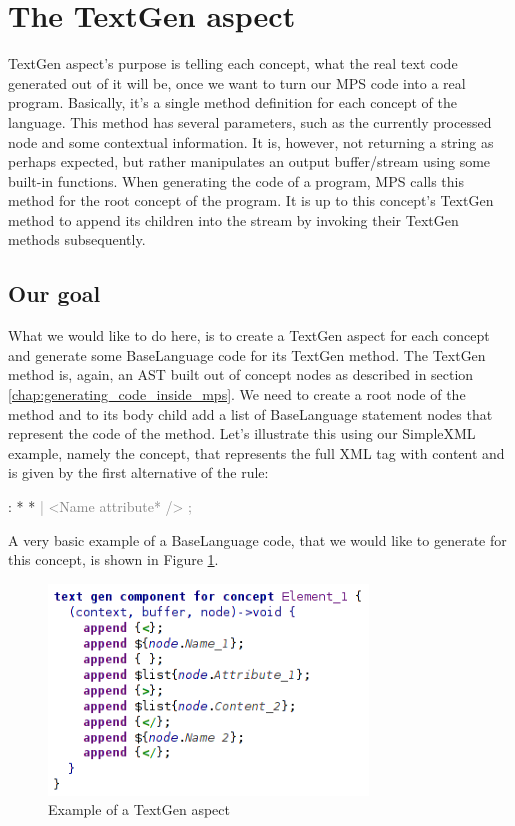 \section{The TextGen aspect}
\label{chap:textgen}

TextGen aspect's purpose is telling each concept, what the real text code generated out of it will be, once we want to turn our MPS code into a real program.
Basically, it's a single method definition for each concept of the language.
This method has several parameters, such as the currently processed node and some contextual information.
It is, however, not returning a string as perhaps expected, but rather manipulates an output buffer/stream using some built-in functions.
When generating the code of a program, MPS calls this method for the root concept of the program.
It is up to this concept's TextGen method to append its children into the stream by invoking their TextGen methods subsequently.

\subsection{Our goal}

What we would like to do here, is to create a TextGen aspect for each concept and generate some BaseLanguage code for its TextGen method.
The TextGen method is, again, an AST built out of concept nodes as described in section \ref{chap:generating_code_inside_mps}.
We need to create a root node of the method and to its body child add a list of BaseLanguage statement nodes that represent the code of the method.
Let's illustrate this using our SimpleXML example, namely the  concept, that represents the full XML tag with content and is given by the first alternative of the  rule:

\begin{antlr}
	   :   \literal{<}  * \literal{>} * \literal{</}  \literal{>}
          \textcolor{gray}{|   \ap<\ap Name attribute* \ap/>\ap}
          \textcolor{gray}{;}
\end{antlr}

A very basic example of a BaseLanguage code, that we would like to generate for this concept, is shown in Figure \ref{fig:textgen_example}.

\begin{figure}[h]
	\centering
	\includegraphics[width=85mm]{./img/textgen_example.png}
	\caption{Example of a TextGen aspect}
	\label{fig:textgen_example}
\end{figure}

